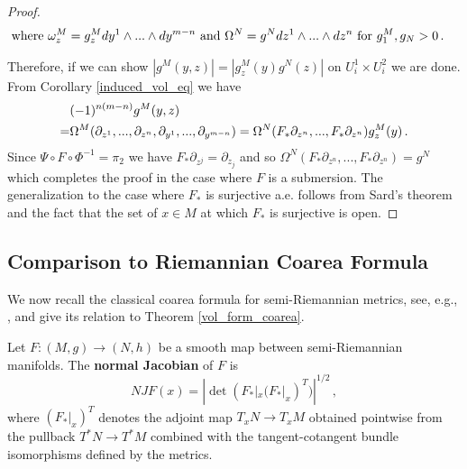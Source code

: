 \begin{proof}
\begin{align}
&\text{where }\omega^M_z=g^M_z dy^1\wedge...\wedge dy^{m-n} \text{ and }\Omega^N=g^N dz^1\wedge...\wedge dz^n \text{ for } g_1^M,g_N>0\,.\notag
\end{align}
\begin{comment}
Here we used that if \pi_1\circ \Phi is the chart on F^{-1}(z) then the inverse is y->\Phi^{-1}(y,Psi(z)) since \pi_2\circ\Phi(x)=\Psi(z)
for any x\in F^{-1}(z)
\end{comment}
Therefore, if we can show $|g^M(y,z)|=|g_z^M(y)g^N(z)|$ on $U_i^1\times U_i^2$ we are done. From Corollary \ref{induced_vol_eq} we have
\begin{align}
&(-1)^{n(m-n)} g^M(y,z)\\
=&\Omega^M(\partial_{z^1},...,\partial_{z^n},\partial_{y^1},...,\partial_{y^{m-n}})=\Omega^N(F_*\partial_{z^n},...,F_*\partial_{z^n})g_z^M(y)\,.\notag
\end{align}
Since $\Psi\circ F\circ\Phi^{-1}=\pi_2$ we have $F_*\partial_{z^j}=\partial_{z_j}$ and so $\Omega^N(F_*\partial_{z^n},...,F_*\partial_{z^n})=g^N$ which completes the proof in the case where $F$ is a submersion.  The generalization to the case where $F_*$ is surjective a.e. follows from Sard's theorem and the fact that the set of $x\in M$ at which $F_*$ is surjective is open.

\begin{comment}
The set K of $x\in M$ where $F_*$ is surjective is open in M by the rank theorem and by assumption, its complement has M-measure zero.  Therefore the lhs equal int_K f dOmega^M. F is a submersion on $K$ so   int_K f dOmega^M=int_N int_F|K^{-1}(z) f omega^M_z Omega^N.  Split this into an integral over regular values of $F:M->N$ and crit values.  The int over crit values is zero by Sard.  For z a regular value, F|_K^{-1}(z)=F^{-1}(z) Hence the lhs is int_N_ref int_F^{-1}(z) f omega^M_z Omega^N. 

  Split the rhs into integral over critical  values of F:M->N and regular values.  The integral over crit values is
 zero by sard, hence the rhs is
int_N_reg int F^{-1}(z).  Therefore they are equal.  QED
\end{comment}
\end{proof}
\subsection{Comparison to Riemannian Coarea Formula}
We now recall the classical coarea formula for semi-Riemannian metrics, see, e.g., \cite{chavel1995riemannian},  and give its relation to Theorem \ref{vol_form_coarea}.
\begin{definition}
Let $F:(M,g)\rightarrow (N,h)$ be a smooth map between semi-Riemannian manifolds.  The {\bf normal Jacobian} of $F$ is
\begin{equation}
NJF(x)=|\det(F_*|_x(F_*|_x)^T)|^{1/2}\,,
\end{equation}
where $(F_*|_x)^T$ denotes the adjoint map $T_xN\rightarrow T_xM$ obtained pointwise from the pullback $T^*N\rightarrow T^*M$ combined with the tangent-cotangent bundle isomorphisms defined by the metrics.
\end{definition}

